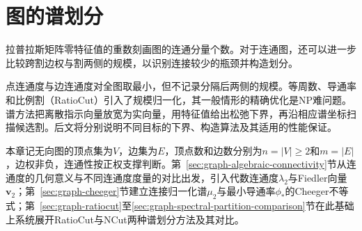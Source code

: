 \chapter{图的谱划分}
\label{chap:spectral-partition}

拉普拉斯矩阵零特征值的重数刻画图的连通分量个数。对于连通图，还可以进一步比较跨割边权与割两侧的规模，以识别连接较少的瓶颈并构造划分。

点连通度与边连通度对全图取最小，但不记录分隔后两侧的规模。等周数、导通率和比例割（RatioCut）引入了规模归一化，其一般情形的精确优化是NP难问题。谱方法把离散指示向量放宽为实向量，用特征值给出松弛下界，再沿相应谱坐标扫描候选割。后文将分别说明不同目标的下界、构造算法及其适用的性能保证。

本章记无向图的顶点集为$V$，边集为$E$，顶点数和边数分别为$n=|V|\geq 2$和$m=|E|$，边权非负，连通性按正权支撑判断。第~\ref{sec:graph-algebraic-connectivity}节从连通度的几何意义与不同连通度度量的对比出发，引入代数连通度$\lambda_2$与Fiedler向量$\bm v_2$；第~\ref{sec:graph-cheeger}节建立连接归一化谱$\mu_2$与最小导通率$\phi_*$的Cheeger不等式；第~\ref{sec:graph-ratiocut}至\ref{sec:graph-spectral-partition-comparison}节在此基础上系统展开RatioCut与NCut两种谱划分方法及其对比。







